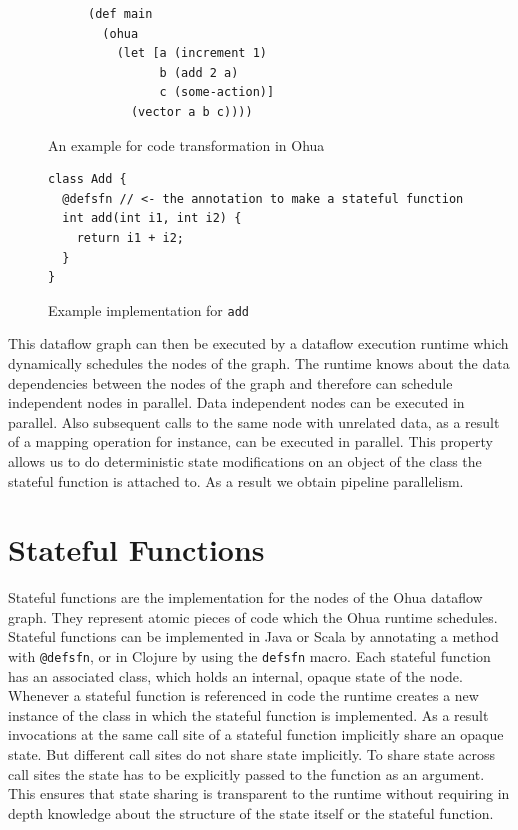 \begin{figure}[h]
  \begin{subfigure}{.5\textwidth}
\begin{verbatim}
(def main
  (ohua
    (let [a (increment 1)
          b (add 2 a)
          c (some-action)]
      (vector a b c))))
\end{verbatim}
  \end{subfigure}
  \begin{subfigure}{.5\textwidth}
  \end{subfigure}

\caption{An example for code transformation in Ohua}
\label{fig:ohua-code-example}
\end{figure}

\begin{figure}[h]
\begin{verbatim}
class Add {
  @defsfn // <- the annotation to make a stateful function
  int add(int i1, int i2) {
    return i1 + i2;
  }
}
\end{verbatim}
\caption{Example implementation for \texttt{add}}
\label{fig:ohua-sfn-example}
\end{figure}

This dataflow graph can then be executed by a dataflow execution runtime which dynamically schedules the nodes of the graph.
The runtime knows about the data dependencies between the nodes of the graph and therefore can schedule independent nodes in parallel.
Data independent nodes can be executed in parallel.
Also subsequent calls to the same node with unrelated data, as a result of a mapping operation for instance, can be executed in parallel.
This property allows us to do deterministic state modifications on an object of the class the stateful function is attached to.
As a result we obtain pipeline parallelism.

\section{Stateful Functions}

\label{sec:stateful-functions}

Stateful functions are the implementation for the nodes of the Ohua dataflow graph.
They represent atomic pieces of code which the Ohua runtime schedules.
Stateful functions can be implemented in Java or Scala\cite{ScalaLanguage} by annotating a method with \texttt{@defsfn}, or in Clojure by using the \texttt{defsfn} macro.
Each stateful function has an associated class, which holds an internal, opaque state of the node.
Whenever a stateful function is referenced in code the runtime creates a new instance of the class in which the stateful function is implemented.
As a result invocations at the same call site of a stateful function implicitly share an opaque state.
But different call sites do not share state implicitly.
To share state across call sites the state has to be explicitly passed to the function as an argument.
This ensures that state sharing is transparent to the runtime without requiring in depth knowledge about the structure of the state itself or the stateful function.

